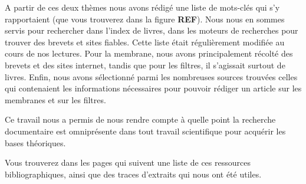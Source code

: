 A partir de ces deux thèmes nous avons rédigé une liste de mots-clés qui s'y rapportaient (que vous trouverez dans la figure \textbf{REF}).%
 Nous nous en sommes servis pour rechercher dans l'index de livres, dans les moteurs de recherches pour trouver des brevets et sites fiables. Cette liste était régulièrement modifiée au cours de nos lectures. Pour la membrane, nous avons principalement récolté des brevets et des sites internet, tandis que pour les filtres, il s'agissait surtout de livres. 
Enfin, nous avons sélectionné parmi les nombreuses sources trouvées celles qui contenaient les informations nécessaires pour pouvoir rédiger un article sur les membranes et sur les filtres.
\newline

Ce travail nous a permis de nous rendre compte à quelle point la recherche documentaire est omniprésente dans tout travail scientifique pour acquérir les bases théoriques.
\newline

Vous trouverez dans les pages qui suivent une liste de ces ressources bibliographiques, ainsi que des traces d'extraits qui nous ont été utiles.

 
 
 
 
 


